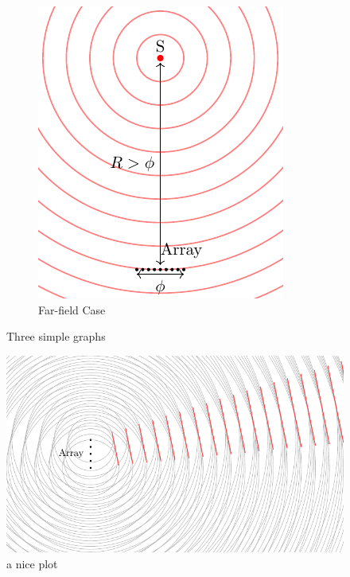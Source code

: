 \begin{figure}
\begin{subfigure}[b]{0.45\textwidth}
        \includegraphics[width=\textwidth]{FarField.pdf}
        \caption{Far-field Case}
        \label{fig:three sin x}
    \end{subfigure}
    \caption{Three simple graphs}
    \label{fig:three graphs}
\end{figure}



\begin{figure}
    \centering
    \includegraphics[]{beamforming_1.pdf}
    \caption{a nice plot}
    \label{fig:mesh1}
\end{figure}
